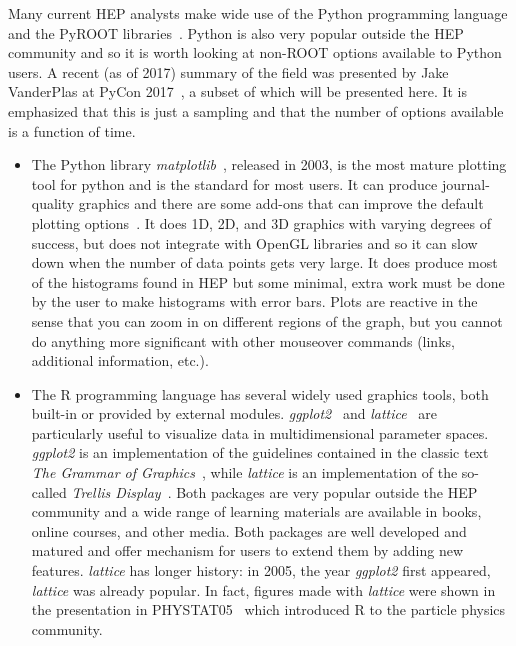 \documentclass[12pt,a4paper]{article}
\begin{document}
Many current HEP analysts make wide use of the Python programming language and the PyROOT libraries~\cite{PyROOT}.
Python is also very popular outside the HEP community and so it is worth looking at non-ROOT options available to Python users.
A recent (as of 2017) summary of the field was presented by Jake VanderPlas at PyCon 2017~\cite{VanderPlas2017}, a subset
of which will be presented here. It is emphasized that this is just a sampling and that the number of options available
is a function of time.

\begin{itemize}
\item The Python library \textit{matplotlib}~\cite{Hunter2007}, released in 2003, is the most mature plotting tool
for python and is the standard for most users. It can produce journal-quality graphics and there are some add-ons
that can improve the default plotting options~\cite{seaborn}. It does 1D, 2D, and 3D graphics with varying degrees
of success, but does not integrate with OpenGL libraries and so it can slow down when the number of data points gets very large.
It does produce most of the histograms found in HEP but some minimal, extra work must be done by the user
to make histograms with error bars. Plots are reactive in the sense that you can zoom in on different regions of the graph,
but you cannot do anything more significant with other mouseover commands (links, additional information, etc.).

\item The R programming language has several widely used graphics tools, both built-in or provided by external modules.
\textit{ggplot2}~\cite{Wickham2009} and \textit{lattice}~\cite{Sarkar2008} are particularly useful to visualize data in
multidimensional parameter spaces. \textit{ggplot2} is an implementation of the guidelines contained in the classic
text \textit{The Grammar of Graphics}~\cite{Wilkinson2005}, while \textit{lattice} is an implementation of the
so-called \textit{Trellis Display}~\cite{Trellis}. Both packages are very popular outside the HEP community and a wide range
of learning materials are available in books, online courses, and other media. Both packages are well developed and matured
and offer mechanism for users to extend them by adding new features.
\textit{lattice} has longer history: in 2005, the year \textit{ggplot2} first appeared, \textit{lattice} was already popular.
In fact, figures made with \textit{lattice} were shown in the
presentation in PHYSTAT05~\cite{phystat05} which introduced R to the
particle physics community.
\end{itemize}
\end{document}
